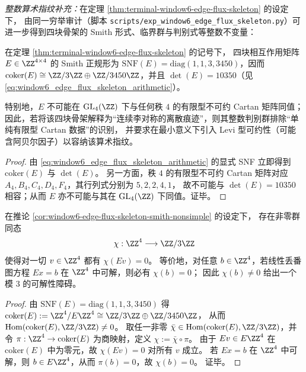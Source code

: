 \emph{整数算术指纹补充：}在定理 \ref{thm:terminal-window6-edge-flux-skeleton} 的设定下，
由同一穷举审计（脚本 \texttt{scripts/exp\_window6\_edge\_flux\_skeleton.py}）可进一步得到四块骨架的 Smith 形式、临界群与判别式等整数不变量：


\begin{corollary}\label{cor:window6-edge-flux-skeleton-smith-nonsimple}
在定理 \ref{thm:terminal-window6-edge-flux-skeleton} 的记号下，
四块相互作用矩阵 \(E\in\ZZ^{4\times 4}\) 的 Smith 正规形为
\(\mathrm{SNF}(E)=\mathrm{diag}(1,1,3,3450)\)，因而
\(\mathrm{coker}(E)\cong \ZZ/3\ZZ\oplus \ZZ/3450\ZZ\)，并且 \(\det(E)=10350\)（见 \eqref{eq:window6_edge_flux_skeleton_arithmetic}）。
\par
特别地，\(E\) 不可能在 \(\mathrm{GL}_4(\ZZ)\) 下与任何秩 \(4\) 的有限型不可约 Cartan 矩阵同值；
因此，若将该四块骨架解释为“连续李对称的离散痕迹”，则其整数判别群排除“单纯有限型 Cartan 数据”的识别，
并要求在最小意义下引入 Levi 型可约性（可能含阿贝尔因子）以容纳该算术指纹。
\end{corollary}
\begin{proof}
由 \eqref{eq:window6_edge_flux_skeleton_arithmetic} 的显式 SNF 立即得到 \(\mathrm{coker}(E)\) 与 \(\det(E)\)。
另一方面，秩 \(4\) 的有限型不可约 Cartan 矩阵对应 \(A_4,B_4,C_4,D_4,F_4\)，其行列式分别为 \(5,2,2,4,1\)，
故不可能与 \(\det(E)=10350\) 相容；从而 \(E\) 亦不可能与其在 \(\mathrm{GL}_4(\ZZ)\) 下同值。证毕。
\end{proof}

\begin{corollary}[模 \(3\) 的可解性障碍与三阶挠率]\label{cor:window6-edge-flux-mod3-obstruction}
在推论 \ref{cor:window6-edge-flux-skeleton-smith-nonsimple} 的设定下，
存在非零群同态
\[
\chi:\ZZ^4\longrightarrow \ZZ/3\ZZ
\]
使得对一切 \(v\in\ZZ^4\) 都有 \(\chi(Ev)=0\)。
等价地，对任意 \(b\in\ZZ^4\)，若线性丢番图方程 \(Ex=b\) 在 \(\ZZ^4\) 中可解，则必有 \(\chi(b)=0\)；
因此 \(\chi(b)\neq 0\) 给出一个模 \(3\) 的可解性障碍。
\end{corollary}
\begin{proof}
由 \(\mathrm{SNF}(E)=\mathrm{diag}(1,1,3,3450)\) 得
\(\mathrm{coker}(E):=\ZZ^4/E\ZZ^4\cong \ZZ/3\ZZ\oplus \ZZ/3450\ZZ\)，
从而 \(\mathrm{Hom}(\mathrm{coker}(E),\ZZ/3\ZZ)\neq 0\)。
取任一非零 \(\bar\chi\in \mathrm{Hom}(\mathrm{coker}(E),\ZZ/3\ZZ)\)，并令 \(\pi:\ZZ^4\to \mathrm{coker}(E)\) 为商映射，定义 \(\chi:=\bar\chi\circ \pi\)。
由于 \(Ev\in E\ZZ^4\) 在 \(\mathrm{coker}(E)\) 中为零元，故 \(\chi(Ev)=0\) 对所有 \(v\) 成立。
若 \(Ex=b\) 在 \(\ZZ^4\) 中可解，则 \(b\in E\ZZ^4\)，从而 \(\pi(b)=0\)，故 \(\chi(b)=0\)。
证毕。
\end{proof}

